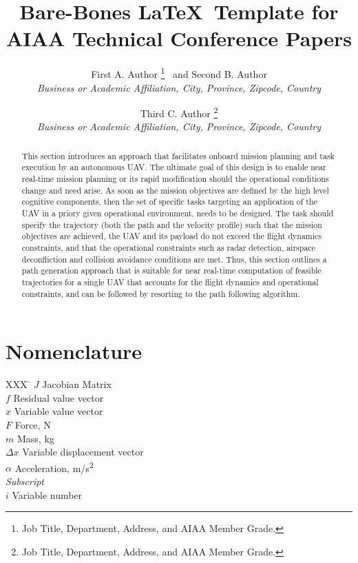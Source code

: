 \documentclass[]{aiaa-tc}%
\title{Bare-Bones \LaTeX\ Template for\\
        AIAA Technical Conference Papers}
\author{
  First A. Author%
    \thanks{Job Title, Department, Address, and AIAA Member Grade.}
  \ and Second B. Author\thanksibid{1}\\
  {\normalsize\itshape
   Business or Academic Affiliation, City, Province, Zipcode, Country}\\
  \and
  Third C. Author%
   \thanks{Job Title, Department, Address, and AIAA Member Grade.}\\
  {\normalsize\itshape
  Business or Academic Affiliation, City, Province, Zipcode, Country}
 }
\begin{document}
\maketitle

\begin{abstract}
This section introduces an approach that facilitates onboard mission planning and
task execution by an autonomous UAV. The ultimate goal of this design is to enable
near real-time mission planning or its rapid modification should the operational
conditions change and need arise. As soon as the mission objectives are defined by
the high level cognitive components, then the set of specific tasks targeting an
application of the UAV in a priory given operational environment, needs to be
designed. The task should specify the trajectory (both the path and the velocity
profile) such that the mission objectives are achieved, the UAV and its payload do
not exceed the flight dynamics constraints, and that the operational constraints such
as radar detection, airspace deconfliction and collision avoidance conditions are
met. Thus, this section outlines a path generation approach that is suitable for near
real-time computation of feasible trajectories for a single UAV that accounts for the
flight dynamics and operational constraints, and can be followed by resorting to the
path following algorithm\cite{JGCD10_PFL1aug}.
\end{abstract}

\section*{Nomenclature}

\begin{tabbing}
  XXX \= \kill%
  $J$ \> Jacobian Matrix \\
  $f$ \> Residual value vector \\
  $x$ \> Variable value vector \\
  $F$ \> Force, N \\
  $m$ \> Mass, kg \\
  $\Delta x$ \> Variable displacement vector \\
  $\alpha$ \> Acceleration, m/s\textsuperscript{2} \\[5pt]
  \textit{Subscript}\\
  $i$ \> Variable number \\
 \end{tabbing}
\end{document}
